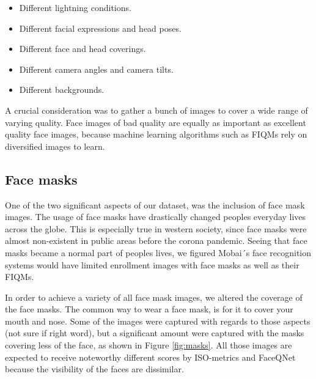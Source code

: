 \begin{itemize}
    \item Different lightning conditions.
    \item Different facial expressions and head poses.
    \item Different face and head coverings. 
    \item Different camera angles and camera tilts.
    \item Different backgrounds.
\end{itemize}

A crucial consideration was to gather a bunch of images to cover a wide range of varying quality. Face images of bad quality are equally as important as excellent quality face images, because machine learning algorithms such as FIQMs rely on diversified images to learn.  

\subsection*{Face masks}
One of the two significant aspects of our dataset, was the inclusion of face mask images. The usage of face masks have drastically changed peoples everyday lives across the globe. This is especially true in western society, since face masks were almost non-existent in public areas before the corona pandemic. Seeing that face masks became a normal part of peoples lives, we figured Mobai´s face recognition systems would have limited enrollment images with face masks as well as their FIQMs. 

In order to achieve a variety of all face mask images, we altered the coverage of the face masks. The common way to wear a face mask, is for it to cover your mouth and nose. Some of the images were captured with regards to those aspects (not sure if right word), but a significant amount were captured with the masks covering less of the face, as shown in Figure \ref{fig:masks}. All those images are expected to receive noteworthy different scores by ISO-metrics and FaceQNet because the visibility of the faces are dissimilar.  

